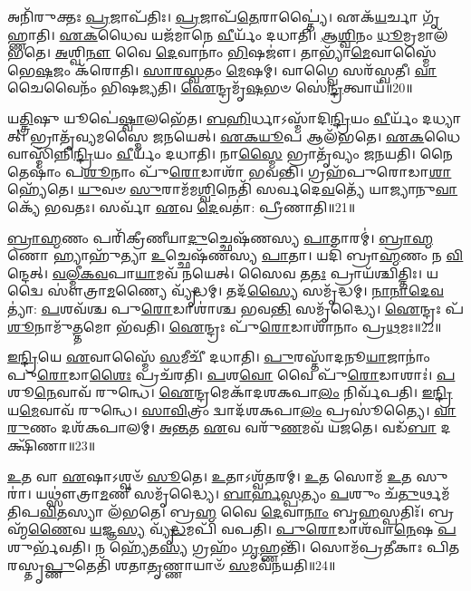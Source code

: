 𑌅𑌨𑌿᳴𑌰𑍁𑌕𑍍𑌤𑌃 \ul{𑌪𑍍𑌰}\-𑌜𑌾\-𑌪᳴𑌤𑌿𑌃।
\-\ul{𑌪𑍍𑌰}\-𑌜𑌾𑌪᳴\-\ul{𑌤𑍇}\-𑌰𑌾𑌪𑍍𑌤𑍍𑌯𑍈॑।
𑌏𑌕᳴\-\ul{𑌯}\-𑌰𑍍𑌚𑌾 𑌗𑍃᳴𑌹𑍍𑌣𑌾𑌤𑌿।
\-\ul{𑌏}\-\-\ul{𑌕}\-𑌧𑍈𑌵 𑌯𑌜᳴𑌮𑌾𑌨𑍇 \ul{𑌵𑍀}\-𑌰𑍍𑌯𑌂᳴ 𑌦𑌧𑌾𑌤𑌿।
\-\ul{𑌆}\-\-\ul{𑌶𑍍𑌵𑌿}\-𑌨𑌂 \ul{𑌧𑍂}\-𑌮𑍍𑌰𑌮𑌾𑌲᳴𑌭𑌤𑍇।
\-\ul{𑌅}\-𑌶𑍍𑌵𑌿\-\ul{𑌨𑍗} 𑌵𑍈 \ul{𑌦𑍇}\-𑌵𑌾𑌨𑌾𑌂॑ \ul{𑌭𑌿}\-𑌷𑌜𑍗॑।
𑌤𑌾𑌭𑍍𑌯𑌾᳴\-\ul{𑌮𑍇}\-𑌵𑌾𑌸𑍍𑌮𑍈᳴ 𑌭𑍇\-\ul{𑌷}\-𑌜𑌂 𑌕᳴𑌰𑍋𑌤𑌿।
\-\ul{𑌸𑌾}\-\-\ul{𑌰}\-\-\ul{𑌸𑍍𑌵}\-𑌤𑌂 \ul{𑌮𑍇}\-𑌷𑌮𑍍।
𑌵𑌾𑌗𑍍𑌵𑍈 𑌸𑌰᳴𑌸𑍍𑌵𑌤𑍀।
\-\ul{𑌵𑌾}\-𑌚𑍈𑌵𑍈𑌨𑌂᳴ 𑌭𑌿𑌷𑌜𑍍𑌯𑌤𑌿।
\-\ul{𑌐}\-𑌨𑍍𑌦𑍍𑌰𑌮𑍃᳴\-\ul{𑌷}\-𑌭𑍞 𑌸𑍇॑\-\ul{𑌨𑍍𑌦𑍍𑌰}\-𑌤𑍍𑌵𑌾𑌯᳴॥20॥\anuvakamend[𑌅\-\ul{𑌕𑍍𑌷𑍍𑌯𑍋}\-𑌰𑍍𑌲𑍋𑌮𑌾᳴\-\ul{𑌨𑌿} 𑌹𑌿𑌰᳴𑌣𑍍𑌯𑌂 𑌵𑌸𑌤𑌿 𑌗𑍃𑌹𑍍𑌣𑌾𑌤𑌿 𑌭𑌿𑌷\-\ul{𑌜𑍍𑌯}\-𑌤𑍍𑌯𑍇𑌕𑌂᳴ 𑌚]

𑌯\-\ul{𑌤𑍍𑌤𑍍𑌰𑌿}\-𑌷𑍁 𑌯𑍂𑌪𑍇॑\-\ul{𑌷𑍍𑌵𑌾}\-𑌲𑌭𑍇᳴𑌤।
\-\ul{𑌬}\-\-\ul{𑌹𑌿}\-𑌰𑍍𑌧𑌾\-𑌽𑌸𑍍𑌮𑌾᳴𑌦𑌿\-\ul{𑌨𑍍𑌦𑍍𑌰𑌿}\-𑌯𑌂 \ul{𑌵𑍀}\-𑌰𑍍𑌯𑌂᳴ 𑌦𑌧𑍍𑌯𑌾𑌤𑍍।
𑌭𑍍𑌰𑌾𑌤𑍃᳴𑌵𑍍𑌯𑌮𑌸𑍍𑌮𑍈 𑌜𑌨𑌯𑍇𑌤𑍍।
\-\ul{𑌏}\-\-\ul{𑌕}\-\-\ul{𑌯𑍂}\-𑌪 𑌆𑌲᳴𑌭𑌤𑍇।
\-\ul{𑌏}\-\-\ul{𑌕}\-𑌧𑍈𑌵𑌾𑌸𑍍𑌮𑌿᳴𑌨𑍍𑌨𑌿\-\ul{𑌨𑍍𑌦𑍍𑌰𑌿}\-𑌯𑌂 \ul{𑌵𑍀}\-𑌰𑍍𑌯𑌂᳴ 𑌦𑌧𑌾𑌤𑌿।
𑌨𑌾\-\ul{𑌸𑍍𑌮𑍈} 𑌭𑍍𑌰𑌾𑌤𑍃᳴𑌵𑍍𑌯𑌂 𑌜𑌨𑌯𑌤𑌿।
𑌨𑍈𑌤𑍇𑌷𑌾𑌂॑ 𑌪\-\ul{𑌶𑍂}\-𑌨𑌾𑌂 𑌪𑍁᳴\-\ul{𑌰𑍋}\-𑌡𑌾𑌶𑌾᳴ 𑌭𑌵𑌨𑍍𑌤𑌿।
𑌗𑍍𑌰𑌹᳴𑌪𑍁𑌰𑍋𑌡𑌾\-\ul{𑌶𑌾} 𑌹𑍍𑌯𑍇᳴𑌤𑍇।
\-\ul{𑌯𑍁}\-𑌵𑍞 \ul{𑌸𑍁}\-𑌰𑌾𑌮᳴𑌮\-\ul{𑌶𑍍𑌵𑌿}\-𑌨𑍇𑌤𑌿᳴ 𑌸𑌰𑍍𑌵𑌦𑍇\-\ul{𑌵}\-𑌤𑍍𑌯𑍇᳴ 𑌯𑌾𑌜𑍍𑌯𑌾𑌨𑍁\-\ul{𑌵𑌾}\-𑌕𑍍𑌯𑍇᳴ 𑌭𑌵𑌤𑌃।
𑌸𑌰𑍍𑌵𑌾᳴ \ul{𑌏}\-𑌵 \ul{𑌦𑍇}\-𑌵𑌤𑌾॑: 𑌪𑍍𑌰𑍀𑌣𑌾𑌤𑌿॥21॥

\-\ul{𑌬𑍍𑌰𑌾}\-\-\ul{𑌹𑍍𑌮}\-𑌣𑌂 𑌪𑌰𑌿᳴𑌕𑍍𑌰𑍀𑌣𑍀𑌯𑌾\-\ul{𑌦𑍁}\-𑌚𑍍𑌛𑍇𑌷᳴𑌣𑌸𑍍𑌯 \ul{𑌪𑌾}\-𑌤𑌾𑌰𑌮𑍍॑।
\-\ul{𑌬𑍍𑌰𑌾}\-\-\ul{𑌹𑍍𑌮}\-𑌣𑍋 𑌹𑍍𑌯𑌾𑌹𑍁᳴𑌤𑍍𑌯𑌾 \ul{𑌉}\-𑌚𑍍𑌛𑍇𑌷᳴𑌣𑌸𑍍𑌯 \ul{𑌪𑌾}\-𑌤𑌾।
𑌯𑌦𑌿᳴ 𑌬𑍍𑌰𑌾\-\ul{𑌹𑍍𑌮}\-𑌣𑌂 𑌨 \ul{𑌵𑌿}\-𑌨𑍍𑌦𑍇𑌤𑍍।
\-\ul{𑌵}\-\-\ul{𑌲𑍍𑌮𑍀}\-\-\ul{𑌕}\-\-\ul{𑌵}\-𑌪𑌾\-\ul{𑌯𑌾}\-𑌮𑌵᳴ 𑌨𑌯𑍇𑌤𑍍।
𑌸𑍈𑌵 𑌤\-\ul{𑌤𑌃} 𑌪𑍍𑌰𑌾𑌯᳴𑌶𑍍𑌚𑌿𑌤𑍍𑌤𑌿𑌃।
𑌯𑌦𑍍𑌵𑍈 𑌸𑍗॑𑌤𑍍𑌰𑌾\-\ul{𑌮}\-𑌣𑍍𑌯𑍈 𑌵𑍍𑌯𑍃᳴𑌦𑍍𑌧𑌮𑍍।
𑌤𑌦᳴\-\ul{𑌸𑍍𑌯𑍈} 𑌸𑌮𑍃᳴𑌦𑍍𑌧𑌮𑍍।
\-\ul{𑌨𑌾}\-\-\ul{𑌨𑌾}\-\-\ul{𑌦𑍇}\-\-\ul{𑌵}\-𑌤𑍍𑌯𑌾॑: \ul{𑌪}\-𑌶𑌵᳴𑌶𑍍𑌚 𑌪𑍁\-\ul{𑌰𑍋}\-𑌡𑌾𑌶𑌾॑𑌶𑍍𑌚 𑌭𑌵\-\ul{𑌨𑍍𑌤𑌿} 𑌸𑌮𑍃᳴𑌦𑍍𑌧𑍍𑌯𑍈।
\-\ul{𑌐}\-𑌨𑍍𑌦𑍍𑌰𑌃 𑌪᳴\-\ul{𑌶𑍂}\-𑌨𑌾𑌮𑍁᳴\-\ul{𑌤𑍍𑌤}\-𑌮𑍋 𑌭᳴𑌵𑌤𑌿।
\-\ul{𑌐}\-𑌨𑍍𑌦𑍍𑌰𑌃 𑌪𑍁᳴\-\ul{𑌰𑍋}\-𑌡𑌾𑌶𑌾᳴𑌨𑌾𑌂 𑌪𑍍𑌰\-\ul{𑌥}\-𑌮𑌃॥22॥

\-\ul{𑌇}\-\-\ul{𑌨𑍍𑌦𑍍𑌰𑌿}\-𑌯𑍇 \ul{𑌏}\-𑌵𑌾𑌸𑍍𑌮𑍈᳴ \ul{𑌸}\-𑌮𑍀𑌚𑍀᳴ 𑌦𑌧𑌾𑌤𑌿।
\-\ul{𑌪𑍁}\-𑌰𑌸𑍍𑌤𑌾᳴𑌦𑌨𑍂\-\ul{𑌯𑌾}\-𑌜𑌾𑌨𑌾𑌂॑ 𑌪𑍁\-\ul{𑌰𑍋}\-𑌡𑌾\-\ul{𑌶𑍈𑌃} 𑌪𑍍𑌰𑌚᳴𑌰𑌤𑌿।
\-\ul{𑌪}\-𑌶\-\ul{𑌵𑍋} 𑌵𑍈 𑌪𑍁᳴\-\ul{𑌰𑍋}\-𑌡𑌾𑌶𑌾𑌃॑।
\-\ul{𑌪}\-𑌶𑍂\-\ul{𑌨𑍇}\-𑌵𑌾𑌵᳴ 𑌰𑍁𑌨𑍍𑌧𑍇।
\-\ul{𑌐}\-𑌨𑍍𑌦𑍍𑌰𑌮𑍇𑌕𑌾᳴\-𑌦𑌶\-𑌕𑌪𑌾\-\ul{𑌲𑌂} 𑌨𑌿𑌰𑍍𑌵᳴𑌪𑌤𑌿।
\-\ul{𑌇}\-\-\ul{𑌨𑍍𑌦𑍍𑌰𑌿}\-𑌯\-\ul{𑌮𑍇}\-𑌵𑌾𑌵᳴ 𑌰𑍁𑌨𑍍𑌧𑍇।
\-\ul{𑌸𑌾}\-\-\ul{𑌵𑌿}\-𑌤𑍍𑌰𑌂 𑌦𑍍𑌵𑌾𑌦᳴𑌶𑌕𑌪𑌾\-\ul{𑌲𑌂} 𑌪𑍍𑌰𑌸𑍂॑𑌤𑍍𑌯𑍈।
\-\ul{𑌵𑌾}\-\-\ul{𑌰𑍁}\-𑌣𑌂 𑌦𑌶᳴𑌕𑌪𑌾𑌲𑌮𑍍।
\-\ul{𑌅}\-\-\ul{𑌨𑍍𑌤}\-𑌤 \ul{𑌏}\-𑌵 𑌵𑌰𑍁᳴\-\ul{𑌣}\-𑌮𑌵᳴ 𑌯𑌜𑌤𑍇।
𑌵𑌡᳴\-\ul{𑌬𑌾} 𑌦𑌕𑍍𑌷𑌿᳴𑌣𑌾॥23॥

\-\ul{𑌉}\-𑌤 𑌵𑌾 \ul{𑌏}\-𑌷𑌾\-𑌽𑌶𑍍𑌵𑍞᳴ \ul{𑌸𑍂}\-𑌤𑍇।
\-\ul{𑌉}\-𑌤𑌾𑌽𑌶𑍍𑌵᳴\-\ul{𑌤}\-𑌰𑌮𑍍।
\-\ul{𑌉}\-𑌤 𑌸𑍋𑌮᳴ \ul{𑌉}\-𑌤 𑌸𑍁𑌰𑌾॑।
𑌯𑌥𑍍𑌸𑍗॑𑌤𑍍𑌰𑌾\-\ul{𑌮}\-𑌣𑍀 𑌸𑌮𑍃᳴𑌦𑍍𑌧𑍍𑌯𑍈।
\-\ul{𑌬𑌾}\-\-\ul{𑌰𑍍}\-\-\ul{𑌹}\-\-\ul{𑌸𑍍𑌪}\-𑌤𑍍𑌯𑌂 \ul{𑌪}\-𑌶𑍁𑌂 𑌚᳴\-\ul{𑌤𑍁}\-𑌰𑍍𑌥𑌮᳴𑌤𑌿𑌪\-\ul{𑌵𑌿}\-𑌤𑌸𑍍𑌯𑌾 𑌲᳴𑌭𑌤𑍇।
𑌬𑍍𑌰\-\ul{𑌹𑍍𑌮} 𑌵𑍈 \ul{𑌦𑍇}\-𑌵𑌾\-\ul{𑌨𑌾𑌂} 𑌬𑍃\-\ul{𑌹}\-𑌸𑍍𑌪𑌤𑌿𑌃᳴।
𑌬𑍍𑌰𑌹𑍍𑌮᳴\-\ul{𑌣𑍈}\-𑌵 \ul{𑌯}\-𑌜𑍍𑌞\-\ul{𑌸𑍍𑌯} 𑌵𑍍𑌯𑍃᳴\-\ul{𑌦𑍍𑌧}\-𑌮𑌪𑌿᳴ 𑌵𑌪𑌤𑌿।
\-\ul{𑌪𑍁}\-\-\ul{𑌰𑍋}\-𑌡𑌾𑌶᳴𑌵𑌾\-\ul{𑌨𑍇}\-𑌷 \ul{𑌪}\-𑌶𑍁𑌰𑍍𑌭᳴𑌵𑌤𑌿।
𑌨 𑌹𑍍𑌯𑍇᳴𑌤\-\ul{𑌸𑍍𑌯} 𑌗𑍍𑌰𑌹𑌂᳴ \ul{𑌗𑍃}\-𑌹𑍍𑌣𑌨𑍍𑌤𑌿᳴।
𑌸𑍋𑌮᳴𑌪𑍍𑌰𑌤𑍀𑌕𑌾𑌃 𑌪𑌿𑌤𑌰𑌸𑍍𑌤𑍃\-\ul{𑌪𑍍𑌣𑍁}\-𑌤𑍇𑌤𑌿᳴ 𑌶𑌤𑌾\-\ul{𑌤𑍃}\-𑌣𑍍𑌣𑌾𑌯𑌾𑍞᳴ \ul{𑌸}\-𑌮𑌵᳴𑌨𑌯𑌤𑌿॥24॥

